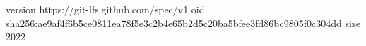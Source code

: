 version https://git-lfs.github.com/spec/v1
oid sha256:ae9af4f6b5ce0811ea78f5e3c2b4e65b2d5c20ba5bfee3fd86bc9805f0c304dd
size 2022
